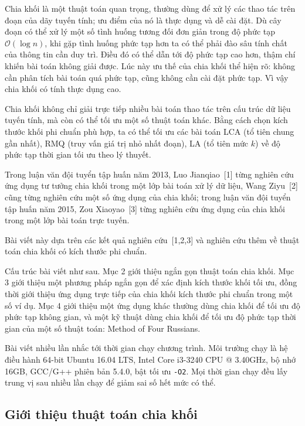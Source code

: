\documentclass[11pt]{article}
\newcommand{\Oh}{\mathcal{O}}
\begin{document}
Chia khối là một thuật toán quan trọng, thường dùng để xử lý các thao tác trên
đoạn của dãy tuyến tính; ưu điểm của nó là thực dụng và dễ cài đặt. Dù cây
đoạn có thể xử lý một số tình huống tương đối đơn giản trong độ phức tạp
\(\Oh(\log n)\), khi gặp tình huống phức tạp hơn ta có thể phải đào sâu tính
chất của thông tin cần duy trì. Điều đó có thể dẫn tới độ phức tạp cao hơn,
thậm chí khiến bài toán không giải được. Lúc này ưu thế của chia khối thể
hiện rõ: không cần phân tích bài toán quá phức tạp, cũng không cần cài đặt
phức tạp. Vì vậy chia khối có tính thực dụng cao.

Chia khối không chỉ giải trực tiếp nhiều bài toán thao tác trên cấu trúc dữ
liệu tuyến tính, mà còn có thể tối ưu một số thuật toán khác. Bằng cách chọn
kích thước khối phi chuẩn phù hợp, ta có thể tối ưu các bài toán LCA (tổ tiên
chung gần nhất), RMQ (truy vấn giá trị nhỏ nhất đoạn), LA (tổ tiên mức \(k\))
về độ phức tạp thời gian tối ưu theo lý thuyết.

Trong luận văn đội tuyển tập huấn năm 2013, Luo Jianqiao~[1] từng nghiên cứu
ứng dụng tư tưởng chia khối trong một lớp bài toán xử lý dữ liệu, Wang
Ziyu~[2] cũng từng nghiên cứu một số ứng dụng của chia khối; trong luận văn
đội tuyển tập huấn năm 2015, Zou Xiaoyao~[3] từng nghiên cứu ứng dụng của
chia khối trong một lớp bài toán trực tuyến.

Bài viết này dựa trên các kết quả nghiên cứu~[1,2,3] và nghiên cứu thêm về
thuật toán chia khối có kích thước phi chuẩn.

Cấu trúc bài viết như sau. Mục 2 giới thiệu ngắn gọn thuật toán chia khối. Mục
3 giới thiệu một phương pháp ngắn gọn để xác định kích thước khối tối ưu, đồng
thời giới thiệu ứng dụng trực tiếp của chia khối kích thước phi chuẩn trong
một số ví dụ. Mục 4 giới thiệu một ứng dụng khác thường dùng chia khối để tối
ưu độ phức tạp không gian, và một kỹ thuật dùng chia khối để tối ưu độ phức
tạp thời gian của một số thuật toán: Method of Four Russians.

Bài viết nhiều lần nhắc tới thời gian chạy chương trình. Môi trường chạy là hệ
điều hành 64-bit Ubuntu 16.04 LTS, Intel Core i3-3240 CPU @ 3.40GHz, bộ nhớ
16GB, GCC/G++ phiên bản 5.4.0, bật tối ưu \texttt{-O2}. Mọi thời gian chạy
đều lấy trung vị sau nhiều lần chạy để giảm sai số hết mức có thể.

\subsection{Giới thiệu thuật toán chia khối}
\end{document}
